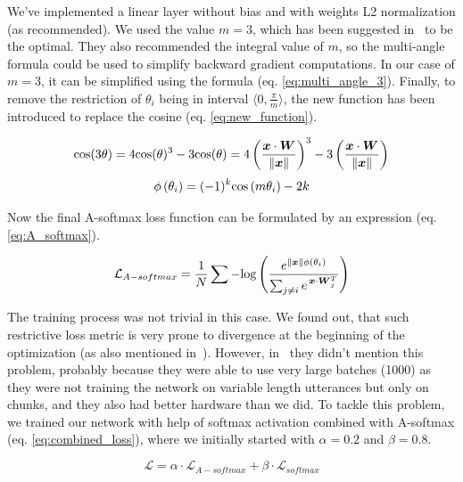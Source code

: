 \medskip
We've implemented a linear layer without 	bias and with weights L2 normalization (as recommended). We used the value $ m = 3 $, which has been suggested in~\cite{A_softmax} to be the optimal. They also recommended the integral value of $ m $, so the multi-angle formula could be used to simplify backward gradient computations. In our case of $ m = 3 $, it can be simplified using the formula (eq. \ref{eq:multi_angle_3}). Finally, to remove the restriction of $ \theta_i $ being in interval $ \langle 0, \frac{\pi}{m} \rangle $, the new function has been introduced to replace the cosine (eq. \ref{eq:new_function}).

\begin{equation} \label{eq:multi_angle_3}
\textnormal{cos}(3\theta) =
4\textnormal{cos}(\theta)^3 - 3\textnormal{cos}(\theta) =
4 \left( \frac{\boldsymbol{x} \cdot \boldsymbol{W}}{\lVert\boldsymbol{x}\rVert} \right) ^3 -
3 \left( \frac{\boldsymbol{x} \cdot \boldsymbol{W}}{\lVert\boldsymbol{x}\rVert} \right)
\end{equation}
\begin{equation} \label{eq:new_function}
\phi \left( \theta_i \right) =
(-1)^k \textnormal{cos} \left( m \theta_i \right) - 2k
\end{equation}

\medskip
\noindent
Now the final A-softmax loss function can be formulated by an expression (eq. \ref{eq:A_softmax}).

\begin{equation} \label{eq:A_softmax}
\mathcal{L}_{A-softmax} = \frac{1}{N} \sum - \textnormal{log} \left(
\frac{e^{\lVert\boldsymbol{x}\rVert \phi(\theta_i)}}
{\sum_{j \neq i} e^{\,\boldsymbol{x} \cdot \boldsymbol{W}_j^T}}
\right)
\end{equation}

\medskip
\noindent
The training process was not trivial in this case. We found out, that such restrictive loss metric is very prone to divergence at the beginning of the optimization (as also mentioned in~\cite{arc_face}). However, in~\cite{A_softmax} they didn't mention this problem, probably because they were able to use very large batches (1000) as they were not training the network on variable length utterances but only on chunks, and they also had better hardware than we did. To tackle this problem, we trained our network with help of softmax activation combined with A-softmax (eq. \ref{eq:combined_loss}), where we initially started with $ \alpha = 0.2 $ and $ \beta = 0.8 $.

\begin{equation} \label{eq:combined_loss}
\mathcal{L} = \alpha \cdot \mathcal{L}_{A-softmax} + \beta \cdot \mathcal{L}_{softmax}
\end{equation}

